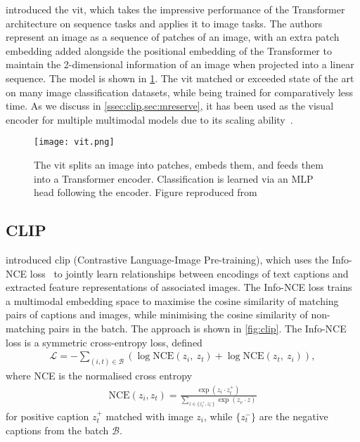 \citet{dosovitskiy2021vit} introduced the \acrfull{vit}, which takes the
impressive performance of the Transformer architecture on sequence tasks and
applies it to image tasks. The authors represent an image as a sequence of
patches of an image, with an extra patch embedding added alongside the
positional embedding of the Transformer to maintain the 2-dimensional
information of an image when projected into a linear sequence. The model is
shown in \cref{fig:vit}. The \acrshort{vit} matched or exceeded state of
the art on many image classification datasets, while being trained for
comparatively less time. As we discuss in \cref{ssec:clip,sec:mreserve}, it has
been used as the visual encoder for multiple multimodal models due to its
scaling ability~\citep{zhai2022scalingvit}.

\begin{figure}[tp]
	\centering
	\texttt{[image: vit.png]}
	\caption{The \acrlong{vit} splits an image into patches, embeds them,
		and feeds them into a Transformer encoder. Classification is learned
		via an MLP head following the encoder. Figure reproduced
		from~\citet{dosovitskiy2021vit}}
	\label{fig:vit}
\end{figure}


\subsection{CLIP}
\label{ssec:clip}

\citet{radford2021clip} introduced \acrshort{clip} (Contrastive Language-Image
Pre-training), which uses the Info-NCE loss~\citep{oord2019infonce} to jointly
learn relationships between encodings of text captions and extracted feature
representations of associated images. The Info-NCE loss trains a multimodal
embedding space to maximise the cosine similarity of matching pairs of captions
and images, while minimising the cosine similarity of non-matching pairs in the
batch. The approach is shown in \cref{fig:clip}. The Info-NCE loss is a
symmetric cross-entropy loss, defined
\begin{align*}
	\mathcal{L} = - \sum_{(i,t) \in \mathcal{B}} 
		\left(\log \mathrm{NCE}(z_{i},~z_{t}) + \log \mathrm{NCE}(z_{t},~z_{i}) \right)
,\end{align*}
where NCE is the normalised cross entropy
\begin{align*}
	\mathrm{NCE}(z_{i}, z_{t}) = \frac{\exp(z_{i}\cdot z_{t}^{+})}
	{\sum_{z\in\{z_{t}^{+},z_{t}^{-}\}} \exp(z_{v}\cdot z)}
\end{align*}
for positive caption $z_{t}^{+}$ matched with image $z_{i}$, while $\{z_{t}^{-}\}$ are
the negative captions from the batch $\mathcal{B}$.

